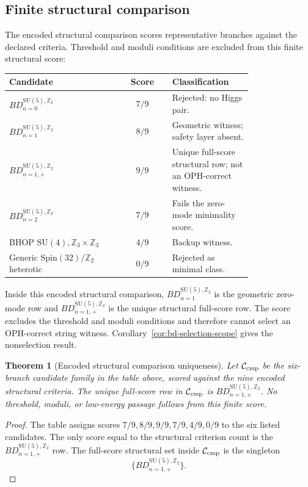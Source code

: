 \documentclass[11pt]{article}
\newtheorem{theorem}{Theorem}[section]
\theoremstyle{remark}
\theoremstyle{plain}
\newcommand{\SU}{\mathrm{SU}}
\newcommand{\Z}{\mathbb Z}
\begin{document}
\subsection{Finite structural comparison}

The encoded structural comparison scores representative branches against the declared criteria.
Threshold and moduli conditions are excluded from this finite structural score:
\begin{longtable}{L{0.46\linewidth}c L{0.33\linewidth}}
\toprule
\textbf{Candidate} & \textbf{Score} & \textbf{Classification} \\
\midrule
\(BD_{n=0}^{\SU(5),\Z_2}\) & \(7/9\) & Rejected: no Higgs pair. \\
\(BD_{n=1}^{\SU(5),\Z_2}\) & \(8/9\) & Geometric witness; safety layer absent. \\
\(BD_{n=1,+}^{\SU(5),\Z_2}\) & \(9/9\) & Unique full-score structural row;
not an OPH-correct witness. \\
\(BD_{n=2}^{\SU(5),\Z_2}\) & \(7/9\) & Fails the zero-mode minimality score. \\
BHOP \(\SU(4),\Z_3\times\Z_3\) & \(4/9\) & Backup witness. \\
Generic \(\mathrm{Spin}(32)/\Z_2\) heterotic & \(0/9\) & Rejected as minimal class. \\
\bottomrule
\end{longtable}
Inside this encoded structural comparison, \(BD_{n=1}^{\SU(5),\Z_2}\) is the geometric
zero-mode row and \(BD_{n=1,+}^{\SU(5),\Z_2}\) is the unique structural full-score row.
The score excludes the threshold and moduli conditions and therefore cannot select an OPH-correct
string witness. Corollary~\ref{cor:bd-selection-scope} gives the nonselection result.

\begin{theorem}[Encoded structural comparison uniqueness]
Let \(\mathcal C_{\rm cmp}\) be the six-branch candidate family in the table above, scored
against the nine encoded structural criteria. The unique full-score row in
\(\mathcal C_{\rm cmp}\) is \(BD_{n=1,+}^{\SU(5),\Z_2}\). No threshold, moduli, or
low-energy passage follows from this finite score.
\end{theorem}

\begin{proof}
The table assigns scores \(7/9,8/9,9/9,7/9,4/9,0/9\) to the six listed candidates. The only score
equal to the structural criterion count is the \(BD_{n=1,+}^{\SU(5),\Z_2}\) row. The full-score
structural set inside \(\mathcal C_{\rm cmp}\) is the singleton
\[
\{BD_{n=1,+}^{\SU(5),\Z_2}\}.
\]
\end{proof}
\end{document}
